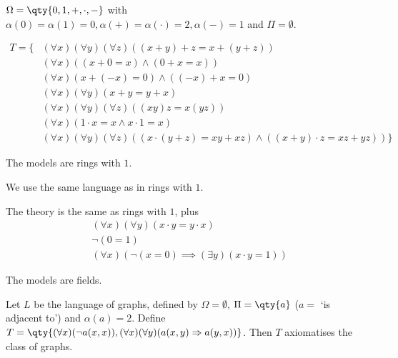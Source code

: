 \begin{example}
    $\Omega = \qty{0, 1, +, \cdot, -}$ with $\alpha(0) = \alpha(1) = 0, \alpha(+) = \alpha(\cdot) = 2, \alpha(-) = 1$ and $\Pi = \emptyset$.

    \begin{align*}
        T = \{
            &(\forall x) (\forall y) (\forall z) ((x + y) + z = x + (y + z)) \\
            &(\forall x) ((x + 0 = x) \wedge (0 + x = x)) \\
            &(\forall x) (x + (-x) = 0) \wedge ((-x) + x = 0) \\
            &(\forall x) (\forall y) (x + y = y + x) \\
            &(\forall x) (\forall y) (\forall z) ((xy)z = x(yz)) \\
            &(\forall x) (1 \cdot x = x \wedge x \cdot 1 = x) \\
            &(\forall x) (\forall y) (\forall z) ((x \cdot (y + z) = xy + xz) \wedge ((x+y) \cdot z = xz + yz))
        \}
    \end{align*}

    The models are rings with $1$.
\end{example}

\begin{example}[Fields]
    We use the same language as in rings with $1$.

    The theory is the same as rings with $1$, plus
    \begin{align*}
        &(\forall x)(\forall y) (x \cdot y = y \cdot x) \\
        &\neg(0 = 1) \\
        &(\forall x) (\neg(x = 0) \implies (\exists y)(x \cdot y = 1))
    \end{align*}

    The models are fields.

\end{example}

\begin{example}
    Let $L$ be the language of graphs, defined by $\Omega = \emptyset$, $\Pi = \qty{a}$ ($a =$ `is adjacent to') and $\alpha(a) = 2$.
    Define $T = \qty{(\forall x)(\neg a(x,x)), (\forall x)(\forall y)(a(x,y) \implies a(y,x))}$.
    Then $T$ axiomatises the class of graphs.
\end{example}

